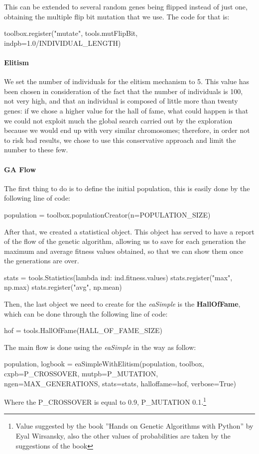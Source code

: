 This can be extended to several random genes being flipped instead of just one, obtaining the multiple flip bit mutation that we use.
The code for that is:
\begin{python}
toolbox.register("mutate", tools.mutFlipBit, indpb=1.0/INDIVIDUAL_LENGTH)
\end{python}


\paragraph{Elitism}
We set the number of individuals for the elitism mechanism to 5. This value has been chosen in consideration of the fact that the number of individuals is 100, not very high, and that an individual is composed of little more than twenty genes: if we chose a higher value for the hall of fame, what could happen is that we could not exploit much the global search carried out by the exploration because we would end up with very similar chromosomes; therefore, in order not to risk bad results, we chose to use this conservative approach and limit the number to these few.

\paragraph{GA Flow}
The first thing to do is to define the initial population, this is easily done by the following line of code:

\begin{python}
population  = toolbox.populationCreator(n=POPULATION_SIZE)
\end{python}

After that, we created a statistical object. This object has served to have a report of the flow of the genetic algorithm, allowing us to save for each generation the maximum and average fitness values obtained, so that we can show them once the generations are over.

\begin{python}
stats = tools.Statistics(lambda ind: ind.fitness.values)
stats.register("max", np.max)
stats.register("avg", np.mean)
\end{python}

Then, the last object we need to create for the \textit{eaSimple} is the \textbf{HallOfFame}, which can be done through the following line of code:

\begin{python}
hof = tools.HallOfFame(HALL_OF_FAME_SIZE)
\end{python}

The main flow is done using the \textit{eaSimple} in the way as follow:

\begin{python}
population, logbook = eaSimpleWithElitism(population,
								  toolbox,
								  cxpb=P_CROSSOVER,
								  mutpb=P_MUTATION,
								  ngen=MAX_GENERATIONS,
								  stats=stats,
								  halloffame=hof,
								  verbose=True)
\end{python}

Where the P\_CROSSOVER is equal to 0.9, P\_MUTATION 0.1.\footnote{Value suggested by the book ”Hands on Genetic Algorithms with Python” by Eyal Wirsansky, also the other values of probabilities are taken by the suggestions of the book}
